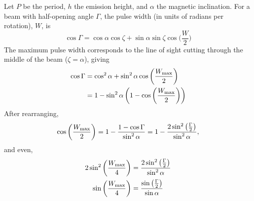 \documentclass{book}
\begin{document}
Let $P$ be the period, $h$ the emission height, and $\alpha$ the magnetic inclination.
For a beam with half-opening angle $\Gamma$, the pulse width (in units of radians per rotation), $W$, is \citep[from spherical geometry, cf.][, Eq. (3.26)]{lorimer2005handbook}
\begin{equation}
  \cos\Gamma
    = \cos\alpha \cos\zeta + \sin\alpha \sin\zeta \cos\bigg(\frac{W}{2}\bigg) 
\end{equation}
The maximum pulse width corresponds to the line of sight cutting through the middle of the beam ($\zeta = \alpha$), giving
\begin{equation}
  \begin{aligned}
    \cos\Gamma
      &= \cos^2\alpha + \sin^2\alpha \cos\bigg(\frac{W_{\rm max}}{2}\bigg) \\
      &= 1 - \sin^2\alpha \left( 1 - \cos\bigg(\frac{W_{\rm max}}{2}\bigg) \right)
  \end{aligned}
\end{equation}
After rearranging,
\begin{equation}
  \cos\bigg(\frac{W_{\rm max}}{2}\bigg)
    = 1 - \frac{1 - \cos\Gamma}{\sin^2\alpha}
    = 1 - \frac{2 \sin^2\left(\frac{\Gamma}{2}\right)}{\sin^2\alpha},
  \label{eqn:width-beam-relation} 
\end{equation}
and even,
\begin{equation}
  \begin{aligned}
  2\sin^2\bigg(\frac{W_{\rm max}}{4}\bigg)
    &= \frac{2 \sin^2\left(\frac{\Gamma}{2}\right)}{\sin^2\alpha} \\
  \sin\bigg(\frac{W_{\rm max}}{4}\bigg)
    &= \frac{\sin\left(\frac{\Gamma}{2}\right)}{\sin\alpha}
  \end{aligned}
\end{equation}
\end{document}
